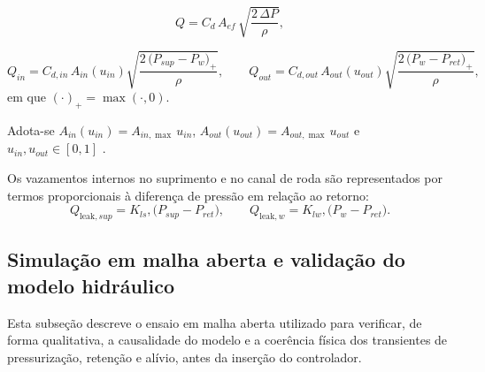 \begin{equation}
    Q = C_d\,A_{ef}\,\sqrt{\frac{2\,\Delta P}{\rho}},
    \label{eq:lei-orificio}
\end{equation}

\begin{equation}
    Q_{in} = C_{d,in}\,A_{in}(u_{in})\sqrt{\frac{2\,\big(P_{sup}-P_w\big)_{+}}{\rho}},
    \qquad
    Q_{out} = C_{d,out}\,A_{out}(u_{out})\sqrt{\frac{2\,\big(P_{w}-P_{ret}\big)_{+}}{\rho}},
    \label{eq:qin_qout}
\end{equation}
em que $(\cdot)_{+}=\max(\cdot,0)$.

Adota-se $A_{in}(u_{in}) = A_{in,\max}\,u_{in}$, $A_{out}(u_{out}) = A_{out,\max}\,u_{out}$ e $u_{in},u_{out}\in[0,1]$ \cite{ProportionalPressureABS2023,Lv2014,ChenLv2017}.

Os vazamentos internos no suprimento e no canal de roda são representados por termos proporcionais à diferença de pressão em relação ao retorno:
\begin{equation}
    Q_{\text{leak},sup} = K_{ls},\big(P_{sup}-P_{ret}\big),
    \qquad
    Q_{\text{leak},w} = K_{lw},\big(P_{w}-P_{ret}\big).
    \label{eq:leaks}
\end{equation}














\subsection{Simulação em malha aberta e validação do modelo hidráulico}
\label{sec:controle-validacao-2p}
Esta subseção descreve o ensaio em malha aberta utilizado para verificar, de forma qualitativa, a causalidade do modelo e a coerência física dos transientes de pressurização, retenção e alívio, antes da inserção do controlador.

